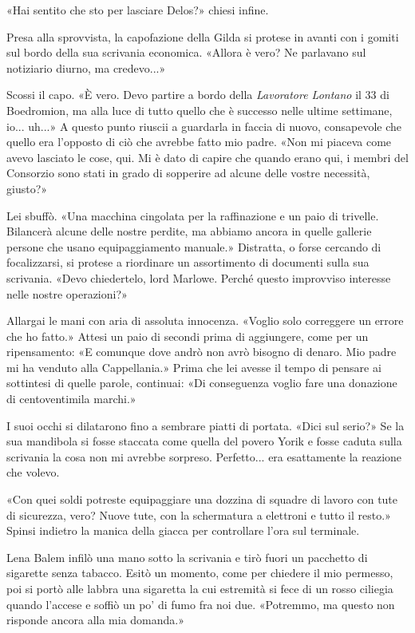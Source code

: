 «Hai sentito che sto per lasciare Delos?» chiesi infine.

Presa alla sprovvista, la capofazione della Gilda si protese in avanti
con i gomiti sul bordo della sua scrivania economica. «Allora è vero? Ne
parlavano sul notiziario diurno, ma credevo...»

Scossi il capo. «È vero. Devo partire a bordo della \emph{Lavoratore
	Lontano} il 33 di Boedromion, ma alla luce di tutto quello che è
successo nelle ultime settimane, io... uh...» A questo punto riuscii a
guardarla in faccia di nuovo, consapevole che quello era l'opposto di
ciò che avrebbe fatto mio padre. «Non mi piaceva come avevo lasciato le
cose, qui. Mi è dato di capire che quando erano qui, i membri del
Consorzio sono stati in grado di sopperire ad alcune delle vostre
necessità, giusto?»

Lei sbuffò. «Una macchina cingolata per la raffinazione e un paio di
trivelle. Bilancerà alcune delle nostre perdite, ma abbiamo ancora in
quelle gallerie persone che usano equipaggiamento manuale.» Distratta, o
forse cercando di focalizzarsi, si protese a riordinare un assortimento
di documenti sulla sua scrivania. «Devo chiedertelo, lord Marlowe.
Perché questo improvviso interesse nelle nostre operazioni?»

Allargai le mani con aria di assoluta innocenza. «Voglio solo correggere
un errore che ho fatto.» Attesi un paio di secondi prima di aggiungere,
come per un ripensamento: «E comunque dove andrò non avrò bisogno di
denaro. Mio padre mi ha venduto alla Cappellania.» Prima che lei avesse
il tempo di pensare ai sottintesi di quelle parole, continuai: «Di
conseguenza voglio fare una donazione di centoventimila marchi.»

I suoi occhi si dilatarono fino a sembrare piatti di portata. «Dici sul
serio?» Se la sua mandibola si fosse staccata come quella del povero
Yorik e fosse caduta sulla scrivania la cosa non mi avrebbe sorpreso.
Perfetto... era esattamente la reazione che volevo.

«Con quei soldi potreste equipaggiare una dozzina di squadre di lavoro
con tute di sicurezza, vero? Nuove tute, con la schermatura a elettroni
e tutto il resto.» Spinsi indietro la manica della giacca per
controllare l'ora sul terminale.

Lena Balem infilò una mano sotto la scrivania e tirò fuori un pacchetto
di sigarette senza tabacco. Esitò un momento, come per chiedere il mio
permesso, poi si portò alle labbra una sigaretta la cui estremità si
fece di un rosso ciliegia quando l'accese e soffiò un po' di fumo fra
noi due. «Potremmo, ma questo non risponde ancora alla mia domanda.»


